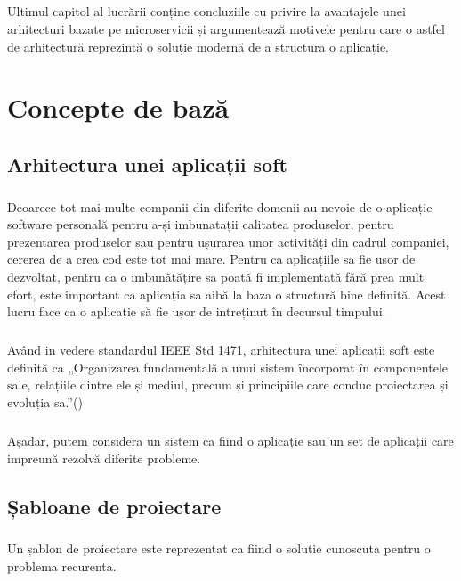 \documentclass[12pt]{report}
\begin{document}
	\paragraph{}Ultimul capitol al lucrării conține concluziile cu privire la avantajele unei arhitecturi bazate pe microservicii și argumentează motivele pentru care o astfel de arhitectură reprezintă o soluție modernă de a structura o aplicație.
\chapter{Concepte de bază} 
  \section{Arhitectura unei aplicații soft}
  	\paragraph{}
  	Deoarece tot mai multe companii din diferite domenii au nevoie de o aplicație software personală pentru a-și imbunatații calitatea produselor, pentru prezentarea produselor sau pentru ușurarea unor activități din cadrul companiei, cererea de a crea cod este tot mai mare. Pentru ca aplicațiile sa fie usor de dezvoltat, pentru ca o imbunătățire sa poată fi implementată fără prea mult efort, este important ca aplicația sa aibă la baza o structură bine definită. Acest lucru face ca o aplicație să fie ușor de intreținut în decursul timpului.
  	\paragraph{}Având in vedere standardul IEEE Std 1471, arhitectura unei aplicații soft este definită ca „Organizarea fundamentală a unui sistem încorporat în componentele sale, relațiile dintre ele și mediul, precum și principiile care conduc proiectarea și evoluția sa.”(\cite{hilliard2000ieee})
  	\paragraph{}Așadar, putem considera un sistem ca fiind o aplicație sau un set de aplicații care impreună rezolvă diferite probleme.
  \section{Șabloane de proiectare}
  \paragraph{}Un șablon de proiectare este reprezentat ca fiind o solutie cunoscuta pentru o problema recurenta.
\end{document}
